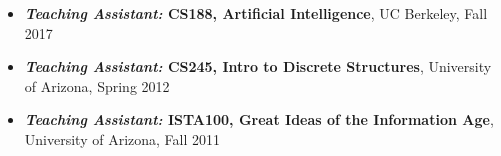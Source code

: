 \begin{itemize}[leftmargin=-0.4mm,partopsep=0pt,label=]
\item \textbf{\emph{Teaching Assistant:} CS188, Artificial Intelligence}, UC Berkeley, Fall 2017 

\item \textbf{\emph{Teaching Assistant:} CS245, Intro to Discrete Structures}, University of Arizona, Spring 2012

\item \textbf{\emph{Teaching Assistant:} ISTA100, Great Ideas of the Information Age}, University of Arizona, Fall 2011





\end{itemize}
